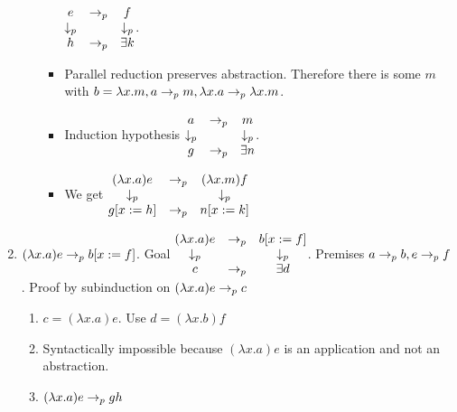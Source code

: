 \documentclass{article}
\begin{document}
\begin{theorem}
\begin{enumerate}
\begin{enumerate}
\begin{itemize}
        $\begin{matrix}
          e & \to_{p} & f \\
          \downarrow_p & & \downarrow_p \\
          h & \to_{p} & \exists k
        \end{matrix}
        $.
      \item Parallel reduction preserves abstraction. Therefore there is some
        $m$ with $b = \lambda x.m, a \to_{p} m, \lambda x.a \to_{p} \lambda
        x.m$.
      \item Induction hypothesis $
        \begin{matrix}
          a & \to_{p} & m \\
          \downarrow_p & & \downarrow_p \\
          g & \to_{p} & \exists n
        \end{matrix}$.
      \item We get $
        \begin{matrix}
          (\lambda x.a) e & \to_{p} & (\lambda x.m) f \\
          \downarrow_p & & \downarrow_p \\
          g[x:=h] & \to_{p} & n[x:=k]
        \end{matrix}$
      \end{itemize}
\end{enumerate}
  \item
    $(\lambda x.a) e \to_{p} b[x:=f]$.
    Goal $
    \begin{matrix}
      (\lambda x.a) e &\to_{p}& b[x:=f] \\
      \downarrow_p & & \downarrow_p \\
      c &\to_{p} & \exists d
    \end{matrix}
    $.
    Premises $a \to_{p} b, e \to_{p} f$.
    Proof by subinduction on $(\lambda x.a) e \to_{p} c$
    \begin{enumerate}
    \item
      $c = (\lambda x.a) e$. Use $d = (\lambda x.b) f$
    \item Syntactically impossible because $(\lambda x.a) e$ is an
      application and not an abstraction.
    \item
      $(\lambda x.a) e \to_{p} g h$
\end{enumerate}
\end{enumerate}
\end{theorem}
\end{document}
